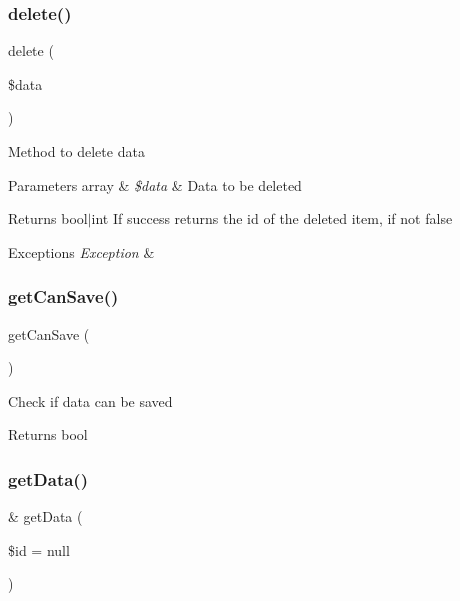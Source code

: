\subsubsection{delete()}
{\footnotesize\ttfamily delete (\begin{DoxyParamCaption}\item[{}]{\$data }\end{DoxyParamCaption})}

Method to delete data


\begin{DoxyParams}[1]{Parameters}
array & {\em \$data} & Data to be deleted\\
\hline
\end{DoxyParams}
\begin{DoxyReturn}{Returns}
bool$\vert$int If success returns the id of the deleted item, if not false
\end{DoxyReturn}

\begin{DoxyExceptions}{Exceptions}
{\em Exception} & \\
\hline
\end{DoxyExceptions}
\mbox{\label{classtks__agenda_model_item_scrap_form_a134bfeed68585befd18a0d39bec60ca5}} 
\subsubsection{get\+Can\+Save()}
{\footnotesize\ttfamily get\+Can\+Save (\begin{DoxyParamCaption}{ }\end{DoxyParamCaption})}

Check if data can be saved

\begin{DoxyReturn}{Returns}
bool 
\end{DoxyReturn}
\mbox{\label{classtks__agenda_model_item_scrap_form_a9d73f97f45946febb1e2793c4c050b2b}} 
\subsubsection{get\+Data()}
{\footnotesize\ttfamily \& get\+Data (\begin{DoxyParamCaption}\item[{}]{\$id = {\ttfamily null} }\end{DoxyParamCaption})}

